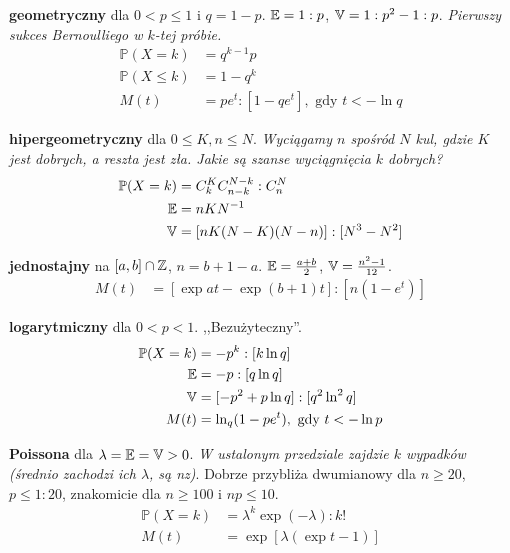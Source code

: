 \begin{multicols*}{2}
\begin{enumx}
	\item \textbf{geometryczny} dla $0 < p \le 1$ i $q = 1 - p$.
	$\mathbb{E} = 1 : p$, $\mathbb{V} = 1:p^2 - 1:p$.
	\emph{Pierwszy sukces Bernoulliego w $k$-tej próbie.}
	\begin{align*}
		\mathbb P(X = k) & = q^{k-1} p \\
		\mathbb P(X \le k) & = 1 - q^k \\
		M(t) & = pe^t : [1 - q e^t], \mbox{ gdy } t < - \ln q
	\end{align*}

	\item \textbf{hipergeometryczny} dla $0 \le K, n \le N$.
	\emph{Wyciągamy $n$ spośród $N$ kul, gdzie $K$ jest dobrych, a reszta jest zła. Jakie są szanse wyciągnięcia $k$ dobrych?}
	\begin{align*}
		\mathbb P(X = k) & = C^K_k C_{n-k}^{N-k} : C_n^N \\
		\mathbb{E} & = nK N^{-1} \\
		\mathbb{V} & = [n K (N-K) (N-n)] : [N^3 - N^2] 
	\end{align*}

	\item \textbf{jednostajny} na $[a,b] \cap \mathbb{Z}$, $n = b + 1 - a$.
	$\mathbb{E} = \frac {a + b}2$, $\mathbb{V} = \frac{n^2-1}{12}$.
	\begin{align*}
		M(t) & = [\exp at - \exp (b+1)t] : [n (1 - e^t)]
	\end{align*}

	\item \textbf{logarytmiczny} dla $0 < p < 1$. ,,Bezużyteczny''.
	\begin{align*}
		\mathbb P(X = k) & = -p^k : [k \ln q] \\
		\mathbb{E} & = -p : [q \ln q] \\
		\mathbb{V} & = [-p^2 + p \ln q]:[q^2 \ln^2 q] \\
		M(t) &  = \ln_q (1 - p e^t), \mbox{ gdy } t < - \ln p
	\end{align*}

	\item \textbf{Poissona} dla $\lambda = \mathbb{E} = \mathbb{V} > 0$.
	\emph{W ustalonym przedziale zajdzie $k$ wypadków (średnio zachodzi ich $\lambda$, są nz)}.
	Dobrze przybliża dwumianowy dla $n \ge 20$, $p \le 1 : 20$, znakomicie dla $n \ge 100$ i $np \le 10$.
	\begin{align*}
		\mathbb P(X = k) & = \lambda^k \exp (-\lambda) : k! \\
		M(t) & = \exp [\lambda (\exp t - 1)]
	\end{align*}


\end{enumx}
\end{multicols*}
